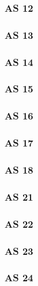 \subsubsection{AS 12}

\subsubsection{AS 13}

\subsubsection{AS 14}

\subsubsection{AS 15}

\subsubsection{AS 16}

\subsubsection{AS 17}

\subsubsection{AS 18}

\subsubsection{AS 21}

\subsubsection{AS 22}

\subsubsection{AS 23}

\subsubsection{AS 24}

